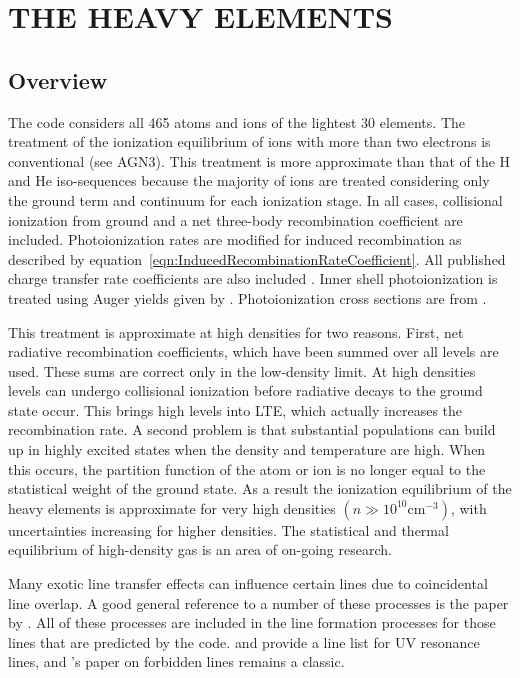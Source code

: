 \chapter{THE HEAVY ELEMENTS}

\section{Overview}

The code considers all 465 atoms and ions of the lightest 30 elements.
The treatment of the ionization equilibrium of ions with more than two
electrons is conventional (see AGN3).  This treatment is more approximate
than that of the H and He iso-sequences because the majority of ions are
treated considering only the ground term and continuum for each ionization
stage.  In all cases, collisional ionization from ground and a net three-body
recombination coefficient are included.
Photoionization rates are modified
for induced recombination as described by equation~\ref{eqn:InducedRecombinationRateCoefficient}.
All published charge transfer rate coefficients are also included
\citep{Kingdon1996}.  Inner shell photoionization is treated using
Auger yields given by \citet{Kaastra1993}.  Photoionization cross
sections are from \citet{VernerFerlandKorista1996}.

This treatment is approximate at high densities for two reasons.  First,
net radiative recombination coefficients, which have been summed over all
levels are used.  These sums are correct only in the low-density limit.
At high densities levels can undergo collisional ionization before radiative
decays to the ground state occur.  This brings high levels into LTE, which
actually increases the recombination rate.  A second problem is that
substantial populations can build up in highly excited states when the
density and temperature are high.  When this occurs, the partition function
of the atom or ion is no longer equal to the statistical weight of the ground
state.  As a result the ionization equilibrium of the heavy elements is
approximate for very high densities $(n \gg 10^{10} \mathrm{cm}^{-3})$, with uncertainties
increasing for higher densities.  The statistical and thermal equilibrium
of high-density gas is an area of on-going research.

Many exotic line transfer effects can influence certain lines due to
coincidental line overlap.  A good general reference to a number of these
processes is the paper by \citet{Swings1940}.  All of these processes
are included in the line formation processes for those lines that are
predicted by the code.  \citet{Morton1988} and
\citet{VernerVernerFerland1996} provide a line list for UV resonance lines, and \citet{Bowen1960}'s
paper on forbidden lines remains a classic.

